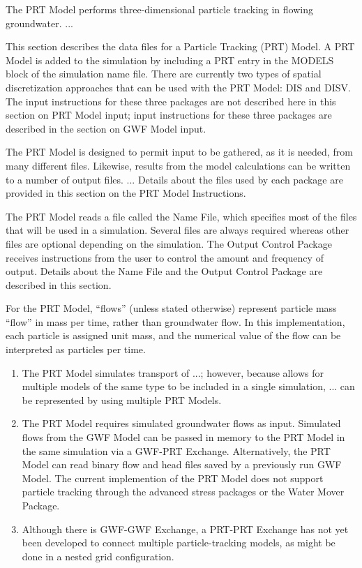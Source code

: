 The PRT Model performs three-dimensional particle tracking in flowing groundwater. ...  

This section describes the data files for a \mf Particle Tracking (PRT) Model.  A PRT Model is added to the simulation by including a PRT entry in the MODELS block of the simulation name file.  There are currently two types of spatial discretization approaches that can be used with the PRT Model: DIS and DISV.  The input instructions for these three packages are not described here in this section on PRT Model input; input instructions for these three packages are described in the section on GWF Model input.

The PRT Model is designed to permit input to be gathered, as it is needed, from many different files.  Likewise, results from the model calculations can be written to a number of output files. ...  Details about the files used by each package are provided in this section on the PRT Model Instructions.

The PRT Model reads a file called the Name File, which specifies most of the files that will be used in a simulation. Several files are always required whereas other files are optional depending on the simulation. The Output Control Package receives instructions from the user to control the amount and frequency of output.  Details about the Name File and the Output Control Package are described in this section.

For the PRT Model, ``flows'' (unless stated otherwise) represent particle mass ``flow'' in mass per time, rather than groundwater flow.  In this implementation, each particle is assigned unit mass, and the numerical value of the flow can be interpreted as particles per time.

\begin{enumerate}

\item The PRT Model simulates transport of ...; however, because \mf allows for multiple models of the same type to be included in a single simulation, ... can be represented by using multiple PRT Models.

\item The PRT Model requires simulated groundwater flows as input. Simulated flows from the GWF Model can be passed in memory to the PRT Model in the same simulation via a GWF-PRT Exchange.  Alternatively, the PRT Model can read binary flow and head files saved by a previously run GWF Model.  The current implemention of the PRT Model does not support particle tracking through the advanced stress packages or the Water Mover Package.

\item Although there is GWF-GWF Exchange, a PRT-PRT Exchange has not yet been developed to connect multiple particle-tracking models, as might be done in a nested grid configuration.  

\end{enumerate}

